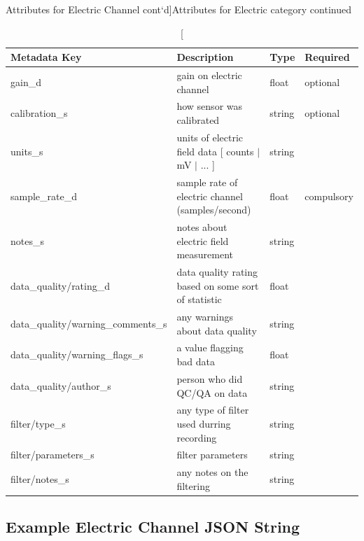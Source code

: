 \documentclass{article}
\begin{document}
\newpage
\begin{table}[htb!]
	\caption[Attributes for Electric Channel cont`d]{Attributes for Electric category continued}
	\begin{tabular}{|l|p{3in}|l|l|}
		\hline
		\textbf{Metadata Key} & \textbf{Description} & \textbf{Type} & \textbf{Required} \\ \hline
		gain\_d & gain on electric channel & float & optional \\ \hline
		calibration\_s & how sensor was calibrated  & string & optional \\ \hline
		units\_s & units of electric field data [ counts $|$ mV $|$ ... ] & string &  \\ \hline
		sample\_rate\_d & sample rate of electric channel (samples/second) & float & compulsory \\ \hline
		notes\_s & notes about electric field measurement & string &  \\ \hline
		data\_quality/rating\_d & data quality rating based on some sort of statistic & float &  \\ \hline
		data\_quality/warning\_comments\_s & any warnings about data quality & string &  \\ \hline
		data\_quality/warning\_flags\_s & a value flagging bad data  & float &  \\ \hline
		data\_quality/author\_s & person who did QC/QA on data & string &  \\ \hline
		filter/type\_s & any type of filter used durring recording & string &  \\ \hline
		filter/parameters\_s & filter parameters & string &  \\ \hline
		filter/notes\_s & any notes on the filtering & string &  \\ \hline
		\end{tabular}
		\label{tab:electric02}
\end{table}	

\newpage
\subsection{Example Electric Channel JSON String}
\end{document}
